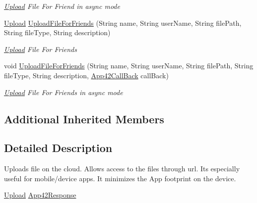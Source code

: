 \begin{DoxyCompactItemize}
\begin{DoxyCompactList}\small\item\em \hyperlink{classcom_1_1shephertz_1_1app42_1_1paas_1_1sdk_1_1csharp_1_1upload_1_1_upload}{Upload} File For Friend in async mode \end{DoxyCompactList}\item 
\hyperlink{classcom_1_1shephertz_1_1app42_1_1paas_1_1sdk_1_1csharp_1_1upload_1_1_upload}{Upload} \hyperlink{classcom_1_1shephertz_1_1app42_1_1paas_1_1sdk_1_1csharp_1_1upload_1_1_upload_service_a6af7c3fc4fcd0808281602c6c1f35dc7}{Upload\+File\+For\+Friends} (String name, String user\+Name, String file\+Path, String file\+Type, String description)
\begin{DoxyCompactList}\small\item\em \hyperlink{classcom_1_1shephertz_1_1app42_1_1paas_1_1sdk_1_1csharp_1_1upload_1_1_upload}{Upload} File For Friends \end{DoxyCompactList}\item 
void \hyperlink{classcom_1_1shephertz_1_1app42_1_1paas_1_1sdk_1_1csharp_1_1upload_1_1_upload_service_ab5f230ae8a4d0bc5c464f2f4802a69e4}{Upload\+File\+For\+Friends} (String name, String user\+Name, String file\+Path, String file\+Type, String description, \hyperlink{interfacecom_1_1shephertz_1_1app42_1_1paas_1_1sdk_1_1csharp_1_1_app42_call_back}{App42\+Call\+Back} call\+Back)
\begin{DoxyCompactList}\small\item\em \hyperlink{classcom_1_1shephertz_1_1app42_1_1paas_1_1sdk_1_1csharp_1_1upload_1_1_upload}{Upload} File For Friends in async mode \end{DoxyCompactList}\end{DoxyCompactItemize}
\subsection*{Additional Inherited Members}


\subsection{Detailed Description}
Uploads file on the cloud. Allows access to the files through url. Its especially useful for mobile/device apps. It minimizes the App footprint on the device. 

\hyperlink{classcom_1_1shephertz_1_1app42_1_1paas_1_1sdk_1_1csharp_1_1upload_1_1_upload_service}{Upload} \hyperlink{classcom_1_1shephertz_1_1app42_1_1paas_1_1sdk_1_1csharp_1_1upload_1_1_upload_service}{App42\+Response} 

